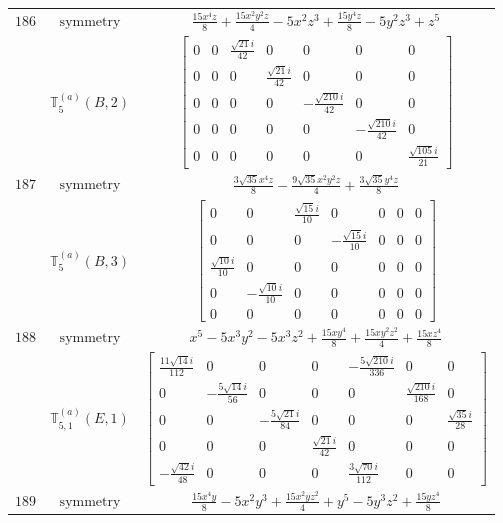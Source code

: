 \documentclass[fleqn,8pt,landscape]{jsarticle}
\begin{document}
\begin{longtable}{ccc}
$ 186 $ & $ \text{symmetry} $ & $ \frac{15 x^{4} z}{8} + \frac{15 x^{2} y^{2} z}{4} - 5 x^{2} z^{3} + \frac{15 y^{4} z}{8} - 5 y^{2} z^{3} + z^{5} $ \\
$  $ & $ \mathbb{T}_{5}^{(a)}(B,2) $ & $ \begin{bmatrix} 0 & 0 & \frac{\sqrt{21} i}{42} & 0 & 0 & 0 & 0 \\ 0 & 0 & 0 & \frac{\sqrt{21} i}{42} & 0 & 0 & 0 \\ 0 & 0 & 0 & 0 & - \frac{\sqrt{210} i}{42} & 0 & 0 \\ 0 & 0 & 0 & 0 & 0 & - \frac{\sqrt{210} i}{42} & 0 \\ 0 & 0 & 0 & 0 & 0 & 0 & \frac{\sqrt{105} i}{21} \end{bmatrix} $ \\ \hline
$ 187 $ & $ \text{symmetry} $ & $ \frac{3 \sqrt{35} x^{4} z}{8} - \frac{9 \sqrt{35} x^{2} y^{2} z}{4} + \frac{3 \sqrt{35} y^{4} z}{8} $ \\
$  $ & $ \mathbb{T}_{5}^{(a)}(B,3) $ & $ \begin{bmatrix} 0 & 0 & \frac{\sqrt{15} i}{10} & 0 & 0 & 0 & 0 \\ 0 & 0 & 0 & - \frac{\sqrt{15} i}{10} & 0 & 0 & 0 \\ \frac{\sqrt{10} i}{10} & 0 & 0 & 0 & 0 & 0 & 0 \\ 0 & - \frac{\sqrt{10} i}{10} & 0 & 0 & 0 & 0 & 0 \\ 0 & 0 & 0 & 0 & 0 & 0 & 0 \end{bmatrix} $ \\ \hline
$ 188 $ & $ \text{symmetry} $ & $ x^{5} - 5 x^{3} y^{2} - 5 x^{3} z^{2} + \frac{15 x y^{4}}{8} + \frac{15 x y^{2} z^{2}}{4} + \frac{15 x z^{4}}{8} $ \\
$  $ & $ \mathbb{T}_{5,1}^{(a)}(E,1) $ & $ \begin{bmatrix} \frac{11 \sqrt{14} i}{112} & 0 & 0 & 0 & - \frac{5 \sqrt{210} i}{336} & 0 & 0 \\ 0 & - \frac{5 \sqrt{14} i}{56} & 0 & 0 & 0 & \frac{\sqrt{210} i}{168} & 0 \\ 0 & 0 & - \frac{5 \sqrt{21} i}{84} & 0 & 0 & 0 & \frac{\sqrt{35} i}{28} \\ 0 & 0 & 0 & \frac{\sqrt{21} i}{42} & 0 & 0 & 0 \\ - \frac{\sqrt{42} i}{48} & 0 & 0 & 0 & \frac{3 \sqrt{70} i}{112} & 0 & 0 \end{bmatrix} $ \\ \hline
$ 189 $ & $ \text{symmetry} $ & $ \frac{15 x^{4} y}{8} - 5 x^{2} y^{3} + \frac{15 x^{2} y z^{2}}{4} + y^{5} - 5 y^{3} z^{2} + \frac{15 y z^{4}}{8} $ \\

\end{longtable}
\end{document}
